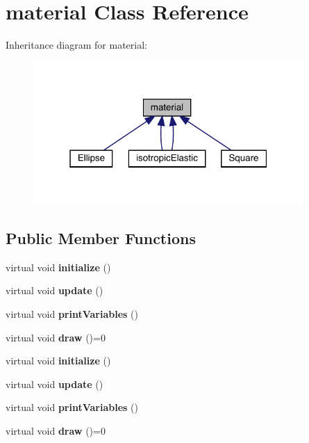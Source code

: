 \hypertarget{classmaterial}{}\section{material Class Reference}
\label{classmaterial}


Inheritance diagram for material\+:
\nopagebreak
\begin{figure}[H]
\begin{center}
\leavevmode
\includegraphics[width=292pt]{classmaterial__inherit__graph}
\end{center}
\end{figure}
\subsection*{Public Member Functions}
\begin{DoxyCompactItemize}
\item 
\mbox{\label{classmaterial_aaddb5d31d5bf8fdd4edd156fd8719b35}} 
virtual void {\bfseries initialize} ()
\item 
\mbox{\label{classmaterial_a21be7be559da44d17eb7f6ad8cd4bbb3}} 
virtual void {\bfseries update} ()
\item 
\mbox{\label{classmaterial_a7b88a4c35fd340b9bc06e6d411022d77}} 
virtual void {\bfseries print\+Variables} ()
\item 
\mbox{\label{classmaterial_ae029d9389f3f676e6416b83f0144afe1}} 
virtual void {\bfseries draw} ()=0
\item 
\mbox{\label{classmaterial_aaddb5d31d5bf8fdd4edd156fd8719b35}} 
virtual void {\bfseries initialize} ()
\item 
\mbox{\label{classmaterial_a21be7be559da44d17eb7f6ad8cd4bbb3}} 
virtual void {\bfseries update} ()
\item 
\mbox{\label{classmaterial_a7b88a4c35fd340b9bc06e6d411022d77}} 
virtual void {\bfseries print\+Variables} ()
\item 
\mbox{\label{classmaterial_ae029d9389f3f676e6416b83f0144afe1}} 
virtual void {\bfseries draw} ()=0
\end{DoxyCompactItemize}
